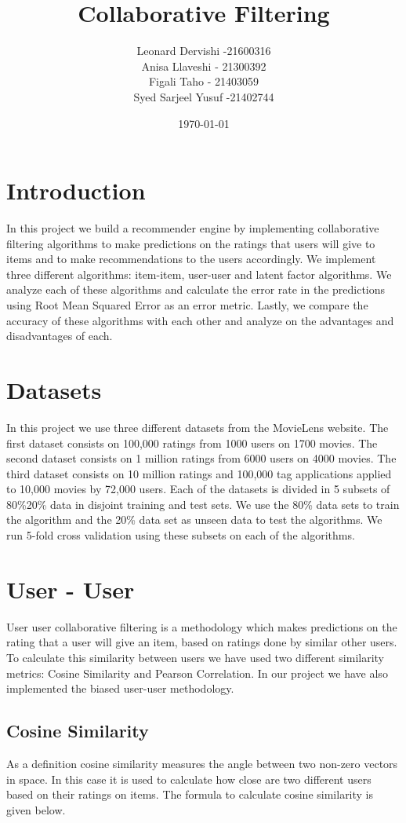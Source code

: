 \documentclass[a4paper]{article}
\title{\Huge Collaborative Filtering}
\author{Leonard Dervishi -21600316 \\ Anisa Llaveshi - 21300392 \\Figali Taho - 21403059 \\ Syed Sarjeel Yusuf -21402744
}
\date{\today}
\begin{document}
\maketitle

\section{Introduction}
\label{sec:introduction}
In this project we build a recommender engine by implementing collaborative filtering algorithms to make predictions on the ratings that users will give to items and to make recommendations to the users accordingly. We implement three different algorithms: item-item, user-user and latent factor algorithms. We analyze each of these algorithms and calculate the error rate in the predictions using Root Mean Squared Error as an error metric. Lastly, we compare the accuracy of these algorithms with each other and analyze on the advantages and disadvantages of each.

\section{Datasets}
In this project we use three different datasets from the MovieLens website. The first dataset consists on 100,000 ratings from 1000 users on 1700 movies. The second dataset consists on 1 million ratings from 6000 users on 4000 movies. The third dataset consists on 10 million ratings and 100,000 tag applications applied to 10,000 movies by 72,000 users\cite{movielens}. Each of the datasets is divided in 5 subsets of 80\%20\% data in disjoint training and test sets. We use the 80\% data sets to train the algorithm and the 20\% data set as unseen data to test the algorithms. We run 5-fold cross validation using these subsets on each of the algorithms.

\section{User - User}
User user collaborative filtering is a methodology which makes predictions on the rating that a user will give an item, based on ratings done by similar other users. To calculate this similarity between users we have used two different similarity metrics: Cosine Similarity and Pearson Correlation. In our project we have also implemented the biased user-user methodology.

\subsection{Cosine Similarity}
As a definition cosine similarity measures the angle between two non-zero vectors in space. In this case it is used to calculate how close are two different users based on their ratings on items. The formula to calculate cosine similarity is given below.
\end{document}
